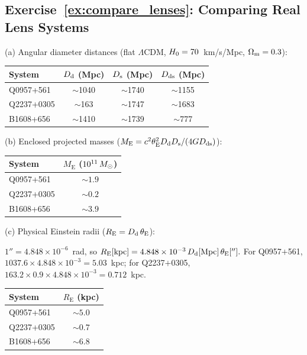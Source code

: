 \subsection*{Exercise~\ref{ex:compare_lenses}: Comparing Real Lens Systems}

(a) Angular diameter distances (flat $\Lambda$CDM,
$H_0 = 70$~km/s/Mpc, $\Omega_{\mathrm{m}} = 0.3$):

\begin{center}
\begin{tabular}{lccc}
\toprule
\textbf{System} & $D_{\mathrm{d}}$ (Mpc) & $D_{\mathrm{s}}$ (Mpc) & $D_{\mathrm{ds}}$ (Mpc) \\
\midrule
Q0957+561  & $\sim$1040 & $\sim$1740 & $\sim$1155 \\
Q2237+0305 & $\sim$163  & $\sim$1747 & $\sim$1683 \\
B1608+656  & $\sim$1410 & $\sim$1739 & $\sim$777  \\
\bottomrule
\end{tabular}
\end{center}

(b) Enclosed projected masses
($M_{\mathrm{E}} = c^2\theta_{\mathrm{E}}^2D_{\mathrm{d}}D_{\mathrm{s}}/(4GD_{\mathrm{ds}})$):

\begin{center}
\begin{tabular}{lc}
\toprule
\textbf{System} & $M_{\mathrm{E}}$ ($10^{11}\,M_{\odot}$) \\
\midrule
Q0957+561  & $\sim 1.9$ \\
Q2237+0305 & $\sim 0.2$ \\
B1608+656  & $\sim 3.9$ \\
\bottomrule
\end{tabular}
\end{center}

(c) Physical Einstein radii ($R_{\mathrm{E}} = D_{\mathrm{d}}\,\theta_{\mathrm{E}}$):

\begin{annotation}
$1'' = 4.848\times10^{-6}$~rad, so $R_{\mathrm{E}}[\mathrm{kpc}] = 4.848\times10^{-3}\,
D_{\mathrm{d}}[\mathrm{Mpc}]\,\theta_{\mathrm{E}}[''].$  For Q0957$+$561,
$1037.6\times4.848\times10^{-3} = 5.03$~kpc; for Q2237$+$0305,
$163.2\times0.9\times4.848\times10^{-3} = 0.712$~kpc.
\end{annotation}


\begin{center}
\begin{tabular}{lc}
\toprule
\textbf{System} & $R_{\mathrm{E}}$ (kpc) \\
\midrule
Q0957+561  & $\sim 5.0$ \\
Q2237+0305 & $\sim 0.7$ \\
B1608+656  & $\sim 6.8$ \\
\bottomrule
\end{tabular}
\end{center}

